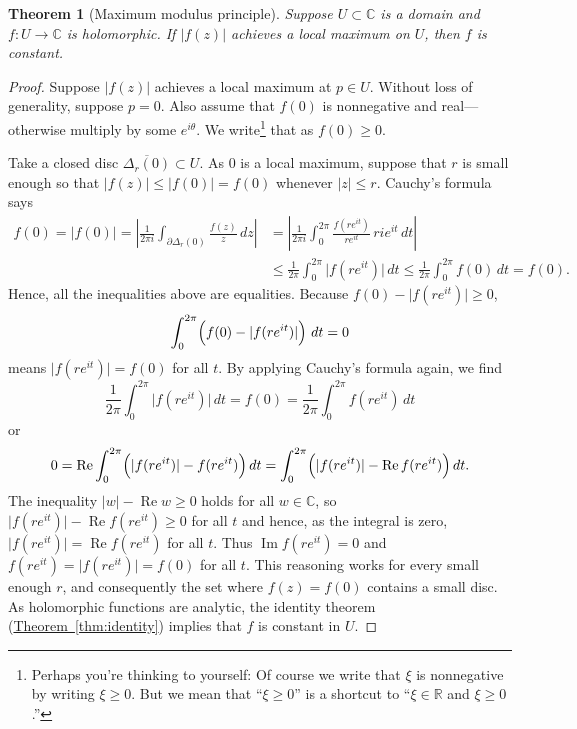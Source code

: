 \documentclass[12pt,openany]{book}
\renewcommand{\Re}{\operatorname{Re}}
\renewcommand{\Im}{\operatorname{Im}}
\newcommand{\sabs}[1]{\lvert {#1} \rvert}
\newcommand{\abs}[1]{\left\lvert {#1} \right\rvert}
\newcommand{\C}{{\mathbb{C}}}
\newcommand{\R}{{\mathbb{R}}}
\newcommand{\myquote}[1]{``#1''}
\theoremstyle{plain}
\newtheorem{thm}{Theorem}[section]
\theoremstyle{remark}
\theoremstyle{definition}
\theoremstyle{exercise}
\theoremstyle{example}
\newcommand{\thmref}[1]{\hyperref[#1]{Theorem~\ref*{#1}}}
\begin{document}
\begin{thm}[Maximum modulus principle]
%
%
Suppose $U \subset \C$ is a domain and
$f \colon U \to \C$ is holomorphic.
If $\sabs{f(z)}$ achieves a local maximum on $U$, then $f$ is constant.
\end{thm}

\begin{proof}
Suppose $\sabs{f(z)}$ achieves a local maximum at $p \in U$.
Without loss of generality, suppose $p = 0$.
Also assume that $f(0)$ is nonnegative and real---otherwise multiply by 
some $e^{i\theta}$.
We write\footnote{%
Perhaps you're thinking to yourself: Of course we write that $\xi$ is
nonnegative by writing $\xi \geq 0$.
But we mean that \myquote{$\xi \geq 0$}
is a shortcut to \myquote{$\xi \in \R$ and $\xi \geq 0$.}}
that as $f(0) \geq 0$.

Take a closed disc $\overline{\Delta_r(0)} \subset U$.
As $0$ is a local maximum, suppose that $r$ is small enough
so that
$\sabs{f(z)} \leq \sabs{f(0)} = f(0)$ whenever $\sabs{z} \leq r$.
Cauchy's formula says
\begin{equation*}
\begin{split}
f(0) = \sabs{f(0)} =
\abs{\frac{1}{2\pi i}
\int_{\partial \Delta_r(0)}
\frac{f(z)}{z} \, dz
}
& =
\abs{
\frac{1}{2\pi i}
\int_0^{2\pi}
\frac{f(re^{it})}{re^{it}} \, ri e^{it} \, dt
}
\\
& \leq
\frac{1}{2\pi}
\int_0^{2\pi}
\sabs{f(re^{it})}\, dt
\leq
\frac{1}{2\pi}
\int_0^{2\pi}
f(0)\, dt = f(0) .
\end{split}
\end{equation*}
Hence, all the inequalities above are equalities.
Because $f(0)-\sabs{f(re^{it})} \geq 0$,
\begin{equation*}
\int_0^{2\pi}\Bigl( f(0)-\sabs{f(re^{it})} \Bigr) \ dt = 0
\end{equation*}
means $\sabs{f(re^{it})} = f(0)$ for all $t$.
By applying Cauchy's formula
again, we find
\begin{equation*}
\frac{1}{2\pi}
\int_0^{2\pi}
\sabs{f(re^{it})}\, dt
=
f(0)
=
\frac{1}{2\pi}
\int_0^{2\pi}
f(re^{it})\, dt
\end{equation*}
or
\begin{equation*}
0 =
\Re \int_0^{2\pi}
\Bigl(\sabs{f(re^{it})}-f(re^{it})\Bigr)\, dt
=
\int_0^{2\pi}
\Bigl(\sabs{f(re^{it})}-\Re f(re^{it})\Bigr)\, dt .
\end{equation*}
The inequality $\sabs{w} - \Re w \geq 0$ holds for all $w \in \C$,
so
$\sabs{f(re^{it})}-\Re f(re^{it}) \geq 0$ for all $t$ and hence,
as the integral is zero,
$\sabs{f(re^{it})}=\Re f(re^{it})$ for all $t$.
Thus $\Im f(re^{it}) = 0$
and 
$f(re^{it})=\sabs{f(re^{it})} = f(0)$ for all $t$.
This reasoning works for every small enough $r$, and consequently the set where
$f(z) = f(0)$ contains a small disc.  As holomorphic functions are analytic,
the identity theorem (\thmref{thm:identity}) implies that $f$ is constant in
$U$.
\end{proof}
\end{document}
